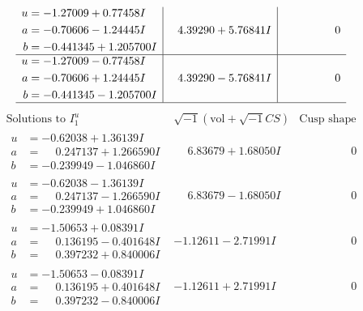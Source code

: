 \documentclass[1p]{elsarticle_modified}
\theoremstyle{definition}
\newcommand{\I}{\sqrt{-1}}
\begin{document}
$$\begin{array}{c|c|c}
\begin{aligned}
u &= -1.27009 + 0.77458 I \\
a &= -0.70606 - 1.24445 I \\
b &= -0.441345 + 1.205700 I\end{aligned}
 & \phantom{-}4.39290 + 5.76841 I & \phantom{-0.000000 } 0 \\ \hline\begin{aligned}
u &= -1.27009 - 0.77458 I \\
a &= -0.70606 + 1.24445 I \\
b &= -0.441345 - 1.205700 I\end{aligned}
 & \phantom{-}4.39290 - 5.76841 I & \phantom{-0.000000 } 0\\
 \hline 
 \end{array}$$\newpage$$\begin{array}{c|c|c}  
\text{Solutions to }I^u_{1}& \I (\text{vol} + \sqrt{-1}CS) & \text{Cusp shape}\\
 \hline 
\begin{aligned}
u &= -0.62038 + 1.36139 I \\
a &= \phantom{-}0.247137 + 1.266590 I \\
b &= -0.239949 - 1.046860 I\end{aligned}
 & \phantom{-}6.83679 + 1.68050 I & \phantom{-0.000000 } 0 \\ \hline\begin{aligned}
u &= -0.62038 - 1.36139 I \\
a &= \phantom{-}0.247137 - 1.266590 I \\
b &= -0.239949 + 1.046860 I\end{aligned}
 & \phantom{-}6.83679 - 1.68050 I & \phantom{-0.000000 } 0 \\ \hline\begin{aligned}
u &= -1.50653 + 0.08391 I \\
a &= \phantom{-}0.136195 - 0.401648 I \\
b &= \phantom{-}0.397232 + 0.840006 I\end{aligned}
 & -1.12611 - 2.71991 I & \phantom{-0.000000 } 0 \\ \hline\begin{aligned}
u &= -1.50653 - 0.08391 I \\
a &= \phantom{-}0.136195 + 0.401648 I \\
b &= \phantom{-}0.397232 - 0.840006 I\end{aligned}
 & -1.12611 + 2.71991 I & \phantom{-0.000000 } 0 \\ \hline\begin{aligned}

\end{aligned}
\end{array}$$
\end{document}
